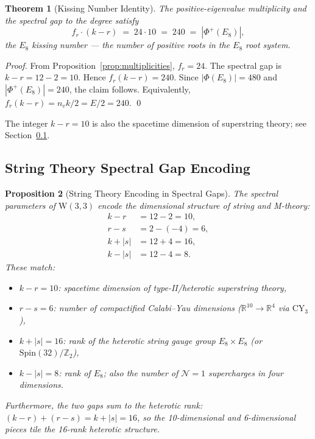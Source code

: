 \documentclass[12pt,a4paper]{article}
\newtheorem{theorem}{Theorem}[section]
\newtheorem{proposition}[theorem]{Proposition}
\newcommand{\W}{\mathrm{W}(3,3)}
\newcommand{\Eone}{E_8}
\newcommand{\nv}{n_{\!v}}
\newcommand{\fr}{f_{\!r}}
\begin{document}
\begin{theorem}[Kissing Number Identity]
\label{thm:kissing}
The positive-eigenvalue multiplicity and the spectral gap to the
degree satisfy
\[
  \boxed{\fr\cdot(k - r) \;=\; 24 \cdot 10 \;=\; 240 \;=\; |\Phi^+(\Eone)|,}
\]
the $E_8$ kissing number --- the number of positive roots in the
$\Eone$ root system.
\end{theorem}

\begin{proof}
From Proposition~\ref{prop:multiplicities}, $\fr = 24$.  The spectral
gap is $k - r = 12 - 2 = 10$.  Hence $\fr(k-r) = 240$.
Since $|\Phi(\Eone)| = 480$ and $|\Phi^+(\Eone)| = 240$, the claim
follows.  Equivalently, $\fr(k-r) = \nv k/2 = E/2 = 240$. \qed
\end{proof}

The integer $k-r = 10$ is also the spacetime dimension of
superstring theory; see Section~\ref{sec:stringgap}.

\subsection{String Theory Spectral Gap Encoding}
\label{sec:stringgap}

\begin{proposition}[String Theory Encoding in Spectral Gaps]
\label{prop:stringgap}
The spectral parameters of $\W$ encode the dimensional structure of
string and M-theory:
\begin{align}
  k - r   &= 12 - 2    = 10,\label{eq:D10}\\
  r - s   &= 2-(-4)    = 6, \label{eq:CY6}\\
  k + |s| &= 12 + 4    = 16,\label{eq:het16}\\
  k - |s| &= 12 - 4    = 8. \label{eq:E8rank}
\end{align}
These match:
\begin{itemize}
  \item $k-r = 10$: spacetime dimension of type-II/heterotic
        superstring theory,
  \item $r-s = 6$: number of compactified Calabi--Yau dimensions
        ($\mathbb{R}^{10} \to \mathbb{R}^4$ via $\text{CY}_3$),
  \item $k+|s| = 16$: rank of the heterotic string gauge group
        $E_8\times E_8$ (or $\text{Spin}(32)/\mathbb{Z}_2$),
  \item $k-|s| = 8$: rank of $E_8$; also the number of $\mathcal{N}=1$
        supercharges in four dimensions.
\end{itemize}
Furthermore, the two gaps sum to the heterotic rank:
$(k-r)+(r-s) = k+|s| = 16$,
so the 10-dimensional and 6-dimensional pieces tile the 16-rank
heterotic structure.
\end{proposition}
\end{document}
